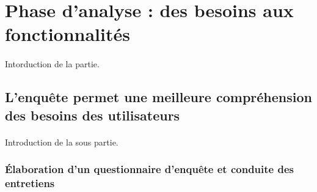 \section{Phase d'analyse : des besoins aux fonctionnalités}
	\paragraph{}
	Intorduction de la partie.
	
	\subsection{L'enquête permet une meilleure compréhension des besoins des utilisateurs}
		\paragraph{}
		Introduction de la sous partie.
		
		\subsubsection{Élaboration d'un questionnaire d'enquête et conduite des entretiens}
			\paragraph{}%
			
			\paragraph{}%
			
			\paragraph{}%
			
			\paragraph{}%
			
			\paragraph{}%
			
			\paragraph{}%
			
